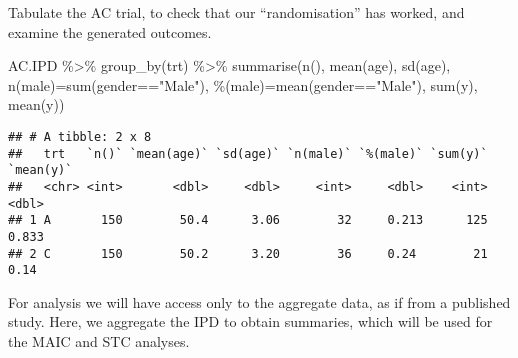 \documentclass[
]{article}
\newenvironment{Shaded}{\begin{snugshade}}{\end{snugshade}}
\newcommand{\AttributeTok}[1]{\textcolor[rgb]{0.77,0.63,0.00}{#1}}
\newcommand{\FunctionTok}[1]{\textcolor[rgb]{0.00,0.00,0.00}{#1}}
\newcommand{\NormalTok}[1]{#1}
\newcommand{\OtherTok}[1]{\textcolor[rgb]{0.56,0.35,0.01}{#1}}
\newcommand{\SpecialCharTok}[1]{\textcolor[rgb]{0.00,0.00,0.00}{#1}}
\newcommand{\StringTok}[1]{\textcolor[rgb]{0.31,0.60,0.02}{#1}}
\begin{document}
Tabulate the AC trial, to check that our ``randomisation'' has worked,
and examine the generated outcomes.

\begin{Shaded}
\begin{Highlighting}[]
\NormalTok{AC.IPD }\SpecialCharTok{\%\textgreater{}\%} \FunctionTok{group\_by}\NormalTok{(trt) }\SpecialCharTok{\%\textgreater{}\%}
  \FunctionTok{summarise}\NormalTok{(}\FunctionTok{n}\NormalTok{(), }\FunctionTok{mean}\NormalTok{(age), }\FunctionTok{sd}\NormalTok{(age), }\StringTok{\textasciigrave{}}\AttributeTok{n(male)}\StringTok{\textasciigrave{}}\OtherTok{=}\FunctionTok{sum}\NormalTok{(gender}\SpecialCharTok{==}\StringTok{"Male"}\NormalTok{),}
            \StringTok{\textasciigrave{}}\AttributeTok{\%(male)}\StringTok{\textasciigrave{}}\OtherTok{=}\FunctionTok{mean}\NormalTok{(gender}\SpecialCharTok{==}\StringTok{"Male"}\NormalTok{), }\FunctionTok{sum}\NormalTok{(y), }\FunctionTok{mean}\NormalTok{(y))}
\end{Highlighting}
\end{Shaded}

\begin{verbatim}
## # A tibble: 2 x 8
##   trt   `n()` `mean(age)` `sd(age)` `n(male)` `%(male)` `sum(y)` `mean(y)`
##   <chr> <int>       <dbl>     <dbl>     <int>     <dbl>    <int>     <dbl>
## 1 A       150        50.4      3.06        32     0.213      125     0.833
## 2 C       150        50.2      3.20        36     0.24        21     0.14
\end{verbatim}

For analysis we will have access only to the aggregate data, as if from
a published study. Here, we aggregate the IPD to obtain summaries, which
will be used for the MAIC and STC analyses.
\end{document}
